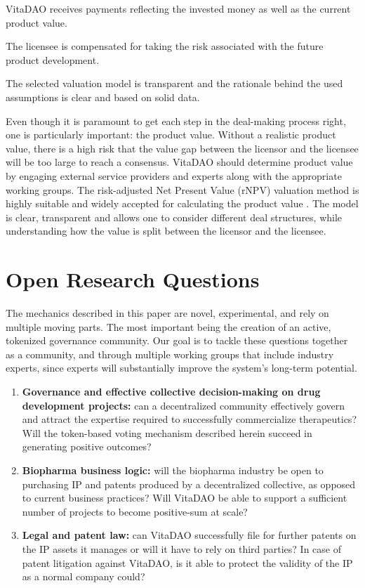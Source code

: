 \documentclass[10pt,letterpaper]{article}
\newenvironment{tight_enumerate}{
\begin{enumerate}
  \setlength{\itemsep}{0pt}
  \setlength{\parskip}{0pt}
}{\end{enumerate}}
\begin{document}
\begin{tight_enumerate}
\item VitaDAO receives payments reflecting the invested money as well as the current product value.
\item The licensee is compensated for taking the risk associated with the future product development.
\item The selected valuation model is transparent and the rationale behind the used assumptions is clear and based on solid data.
\end{tight_enumerate}

Even though it is paramount to get each step in the deal-making process right, one is particularly important: the product value. Without a realistic product value, there is a high risk that the value gap between the licensor and the licensee will be too large to reach a consensus. VitaDAO should determine product value by engaging external service providers and experts along with the appropriate working groups. The risk-adjusted Net Present Value (rNPV) valuation method is highly suitable and widely accepted for calculating the product value \citep{PriceBio}. The model is clear, transparent and allows one to consider different deal structures, while understanding how the value is split between the licensor and the licensee.

\section{Open Research Questions}
The mechanics described in this paper are novel, experimental, and rely on multiple moving parts. The most important being the creation of an active, tokenized governance community. Our goal is to tackle these questions together as a community, and through multiple working groups that include industry experts, since experts will substantially improve the system’s long-term potential.

\begin{enumerate}
\item \textbf{Governance and effective collective decision-making on drug development projects:} can a decentralized community effectively govern and attract the expertise required to successfully commercialize therapeutics? Will the token-based voting mechanism described herein succeed in generating positive outcomes?  
\item \textbf{Biopharma business logic:} will the biopharma industry be open to purchasing IP and patents produced by a decentralized collective, as opposed to current business practices? Will VitaDAO be able to support a sufficient number of projects to become positive-sum at scale?
\item \textbf{Legal and patent law:} can VitaDAO successfully file for further patents on the IP assets it manages or will it have to rely on third parties? In case of patent litigation against VitaDAO, is it able to protect the validity of the IP as a normal company could?
\end{enumerate}
\end{document}
